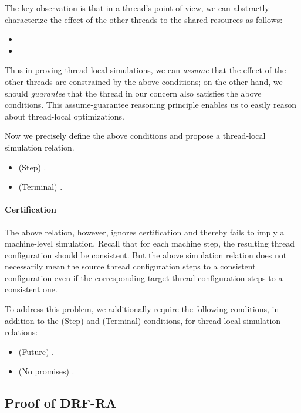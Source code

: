 The key observation is
that in a thread's point of view, we can abstractly characterize the effect of the other threads to
the shared resources as follows:
\begin{itemize}
\item {}
\item {}
\end{itemize}
%
\noindent Thus in proving thread-local simulations, we can \emph{assume} that the effect of the
other threads are constrained by the above conditions; on the other hand, we should \emph{guarantee}
that the thread in our concern also satisfies the above conditions.  This assume-guarantee reasoning
principle enables us to easily reason about thread-local optimizations.

Now we precisely define the above conditions and propose a thread-local simulation relation.

\begin{itemize}
\item (Step) .
\item (Terminal) .
\end{itemize}


\paragraph{Certification}

The above relation, however, ignores certification and thereby fails to imply a machine-level
simulation.  Recall that for each machine step, the resulting thread configuration should be
consistent.  But the above simulation relation does not necessarily mean the source thread
configuration steps to a consistent configuration even if the corresponding target thread
configuration steps to a consistent one.

To address this problem, we additionally require the following conditions, in addition to the (Step)
and (Terminal) conditions, for thread-local simulation relations:
%
\begin{itemize}
\item (Future) .
\item (No promises) .
\end{itemize}
%
\noindent {}



\subsection{Proof of DRF-RA}
\label{sec:relaxed:proofs:drfra}

